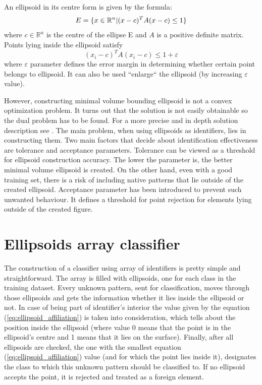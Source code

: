 An ellipsoid in its centre form is given by the formula:
\vspace{-6pt} 
\[ 
\vspace{-3pt}
E = \{x \in \mathbb{R}^{n} | (x - c)^{T}A(x-c) \le 1\} 
\vspace{-3pt}
\] 
where $c \in \mathbb{R}^{n}$ is the centre of the ellipse E and $ A $ is a positive definite matrix. Points lying inside the ellipsoid satisfy 
\begin{equation}\label{eq:ellipsoid_affiliation}(x_{i} - c)^{T}A(x_{i} - c) \le 1 + \varepsilon\end{equation}
where $\varepsilon$ parameter defines the error margin in determining whether certain point belongs to ellipsoid. It can also be used ``enlarge`` the ellipsoid (by increasing $\varepsilon$ value).%

However, constructing minimal volume bounding ellipsoid is not a convex optimization problem. It turns out that the solution is not easily obtainable so the dual problem has to be found. For a more precise and in depth solution description see \cite{MVEEMichaelTodd2005}. The main problem, when using ellipsoids as identifiers, lies in constructing them. Two main factors that decide about identification effectiveness are tolerance and acceptance parameters. Tolerance can be viewed as a threshold for ellipsoid construction accuracy. The lower the parameter is, the better minimal volume ellipsoid is created. On the other hand, even with a good training set, there is a risk of including native patterns that lie outside of the created ellipsoid. Acceptance parameter has been introduced to prevent such unwanted behaviour. It defines a threshold for point rejection for elements lying outside of the created figure.

\section{Ellipsoids array classifier}

The construction of a classifier using array of identifiers is pretty simple and straightforward. The array is filled with ellipsoids, one for each class in the training dataset. Every unknown pattern, sent for classification, moves through those ellipsoids and gets the information whether it lies inside the ellipsoid or not. In case of being part of identifier's interior the value given by the equation (\ref{eq:ellipsoid_affiliation}) is taken into consideration, which tells about the position inside the ellipsoid (where value 0 means that the point is in the ellipsoid's centre and 1 means that it lies on the surface). Finally, after all ellipsoids are checked, the one with the smallest equation (\ref{eq:ellipsoid_affiliation}) value (and for which the point lies inside it), designates the class to which this unknown pattern should be classified to. If no ellipsoid accepts the point, it is rejected and treated as a foreign element. 

